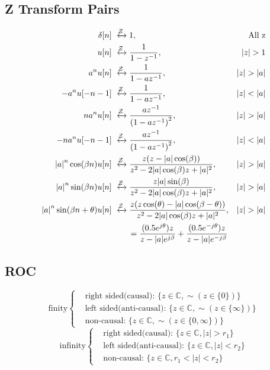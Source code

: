 \subsection{Z Transform Pairs}
\begin{align*}
    \delta [n] &\xleftrightarrow{\mathcal{Z}} 1, &\text{All z}\\
    u[n] &\xleftrightarrow{\mathcal{Z}} \frac{1}{{1 - z^{-1}}},&\left| z \right| > 1\\
    a^n u[n] &\xleftrightarrow{\mathcal{Z}} \frac{1}{1 - az^{-1}},&\left| z \right| > \left| a \right|\\
    -a^n u[-n-1] &\xleftrightarrow{\mathcal{Z}} \frac{1}{1 - az^{-1}},&\left| z \right| < \left| a \right|\\
    na^n u[n] &\xleftrightarrow{\mathcal{Z}} \frac{{az^{-1}}}{{\left( {1 - az^{-1}} \right)^2 }},&\left| z \right| > \left| a \right|\\
    -na^n u[-n-1] &\xleftrightarrow{\mathcal{Z}} \frac{{az^{-1}}}{{\left( {1 - az^{-1}} \right)^2 }},&\left| z \right| < \left| a \right|\\
    \left|a\right|^n\cos (\beta n)u[n] &\xleftrightarrow{\mathcal{Z}} \frac{z(z-\left|a\right|\cos (\beta))}{z^2-2|a|\cos(\beta)z+|a|^2}, &|z|>|a|\\
    \left|a\right|^n\sin (\beta n)u[n] &\xleftrightarrow{\mathcal{Z}} \frac{z|a|\sin(\beta)}{z^2-2|a|\cos(\beta)z+|a|^2}, &|z|>|a|\\
    \left|a\right|^n\sin (\beta n + \theta)u[n] &\xleftrightarrow{\mathcal{Z}} \frac{z(z\cos(\theta)-|a|\cos(\beta-\theta))}{z^2-2|a|\cos(\beta)z+|a|^2}, &|z|>|a|\\
    &\qquad=\frac{(0.5e^{j\theta})z}{z-|a|e^{j\beta}}+\frac{(0.5e^{-j\theta})z}{z-|a|e^{-j\beta}}
\end{align*}
\subsection{ROC}
\begin{equation*}
    \text{finity}
        \begin{cases}
            & \text{right sided(causal): } \{z \in \mathbb{C}, \sim(z\in \{0\})\}\\
            & \text{left sided(anti-causal): } \{z\in \mathbb{C}, \sim(z\in\{\infty\})\}\\
            & \text{non-causal: } \{z\in \mathbb{C}, \sim(z\in\{0, \infty\})\}
        \end{cases}
\end{equation*}
\begin{equation*}
    \text{infinity}
        \begin{cases}
            & \text{right sided(causal): } \{z \in \mathbb{C}, |z| > r_1\}\\
            & \text{left sided(anti-causal): } \{z \in \mathbb{C}, |z| < r_2\}\\
            & \text{non-causal: } \{z \in \mathbb{C}, r_1 < |z| < r_2\}
        \end{cases}
\end{equation*}